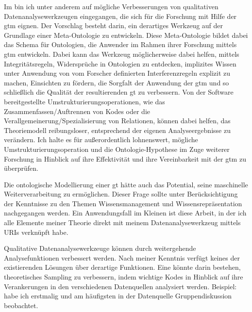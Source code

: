 Im  bin ich unter anderem auf mögliche Verbesserungen von qualitativen Datenanalysewerkzeugen eingegangen, die sich für die Forschung mit Hilfe der \gls{gtm} eignen. Der Vorschlag besteht darin, ein derartiges Werkzeug auf der Grundlage einer Meta-Ontologie zu entwickeln. Diese Meta-Ontologie bildet dabei das Schema für Ontologien, die Anwender im Rahmen ihrer Forschung mittels \gls{gtm} entwickeln. Dabei kann das Werkzeug möglicherweise dabei helfen, mittels Integritätsregeln, Widersprüche in Ontologien zu entdecken, implizites Wissen unter Anwendung von vom Forscher definierten Interferenzregeln explizit zu machen, Einsichten zu fördern, die Sorgfalt der Anwendung der \gls{gtm} und so schließlich die Qualität der resultierenden \gls{gt} zu verbessern. Von der Software bereitgestellte Umstrukturierungsoperationen, wie das Zusammenfassen/Auftrennen von Kodes oder die Verallgemeinerung/Spezialisierung von Relationen, können dabei helfen, das Theoriemodell reibungsloser, entsprechend der eigenen Analyseergebnisse zu verändern. Ich halte es für außerordentlich lohnenswert, mögliche Umstrukturierungsoperation und die Ontologie-Hypothese im Zuge weiterer Forschung in Hinblick auf ihre Effektivität und ihre Vereinbarkeit mit der \gls{gtm} zu überprüfen.

Die ontologische Modellierung einer \gls{gt} hätte auch das Potential, seine maschinelle Weiterverarbeitung zu ermöglichen. Dieser Frage sollte unter Berücksichtigung der Kenntnisse zu den Themen Wissensmanagement und Wissensrepräsentation nachgegangen werden. Ein Anwendungsfall im Kleinen ist diese Arbeit, in der ich alle Elemente meiner Theorie direkt mit meinem Datenanalysewerkzeug mittels URIs verknüpft habe.

Qualitative Datenanalysewerkzeuge können durch weitergehende Analysefunktionen verbessert werden. Nach meiner Kenntnis verfügt keines der existierenden Lösungen über derartige Funktionen. Eine könnte darin bestehen, theoretisches Sampling zu verbessern, indem wichtige Kodes in Hinblick auf ihre Verankerungen in den verschiedenen Datenquellen analysiert werden.
Beispiel:  habe ich erstmalig und am häufigsten in der Datenquelle Gruppendiskussion beobachtet.

